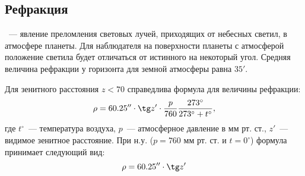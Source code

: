 \subsection{Рефракция}

~--- явление преломления световых лучей, приходящих от небесных светил, в атмосфере планеты. Для наблюдателя на поверхности планеты с атмосферой положение светила будет отличаться от истинного на некоторый угол. Средняя величина рефракции у горизонта для земной атмосферы равна $35'$.

Для зенитного расстояния $z<70$ справедлива формула для величины рефракции:
\begin{equation}
\rho=60.25''\cdot\tg z'\cdot \frac{p}{760}\frac{273^{\circ}}{273^{\circ}+t^{\circ}},
\end{equation}
где $t^{\circ}$~--- температура воздуха, $p$~--- атмосферное давление в мм рт. ст., $z'$~--- видимое зенитное расстояние. При н.у. ($p=760$ мм рт. ст. и $t=0^{\circ}$) формула принимает следующий вид:
\begin{equation}
\rho=60.25''\cdot\tg z'
\end{equation}